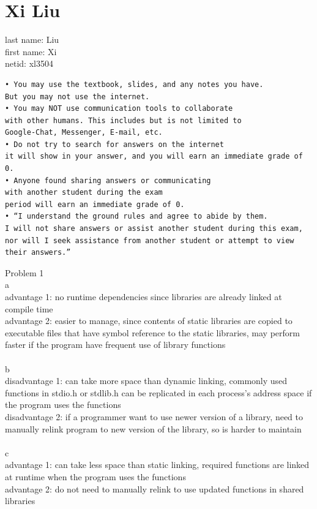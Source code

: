 \documentclass[12pt, border = 4pt, multi]{article} %
\begin{document}
\section*{Xi Liu}
last name: Liu\\
first name: Xi\\
netid: xl3504\\
\begin{verbatim}
• You may use the textbook, slides, and any notes you have.
But you may not use the internet.
• You may NOT use communication tools to collaborate 
with other humans. This includes but is not limited to
Google-Chat, Messenger, E-mail, etc.
• Do not try to search for answers on the internet
it will show in your answer, and you will earn an immediate grade of 0.
• Anyone found sharing answers or communicating
with another student during the exam
period will earn an immediate grade of 0.
• “I understand the ground rules and agree to abide by them.
I will not share answers or assist another student during this exam,
nor will I seek assistance from another student or attempt to view their answers.”
\end{verbatim}
\newpage
\noindent
Problem 1\\
a\\
advantage 1: no runtime dependencies since libraries are already linked at compile time\\
advantage 2: easier to manage, since contents of static libraries are copied to executable files that have symbol reference to the static libraries, may perform faster if the program have frequent use of library functions\\
\\
b\\
disadvantage 1: can take more space than dynamic linking, commonly used functions in stdio.h or stdlib.h can be replicated in each process's address space if the program uses the functions\\
disadvantage 2: if a programmer want to use newer version of a library, need to manually relink program to new version of the library, so is harder to maintain\\
\\
c\\
advantage 1: can take less space than static linking, required functions are linked at runtime when the program uses the functions\\
advantage 2: do not need to manually relink to use updated functions in shared libraries\\
\\
\end{document}
